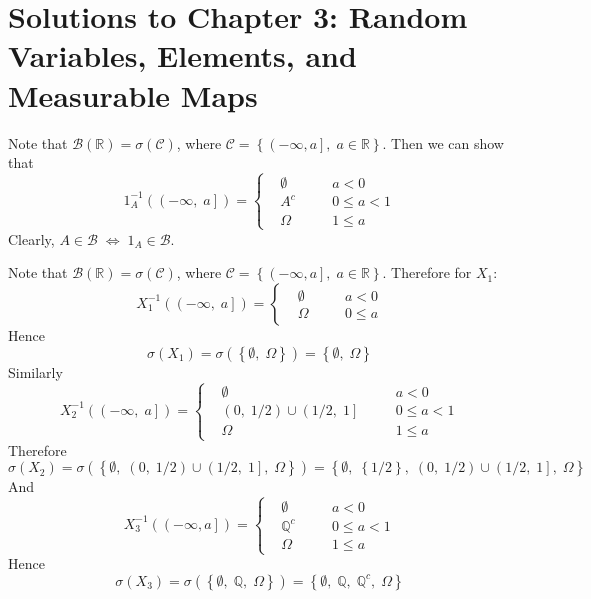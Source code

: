 \section{Solutions to Chapter 3: Random Variables, Elements, and Measurable Maps}
\label{sec:solutions-chapter-3}

\setcounter{Lcount}{0}
\begin{list}{3.4.}{}
\item Note that $\mathcal{B}\left(\mathbb{R}\right) = \sigma\left(\mathcal{C}\right)$, where $\mathcal{C}=\left\{\left(-\infty, a\right],\;a\in\mathbb{R}\right\}$. Then we can show that
  \[
    1_A^{-1}\left(\left(-\infty,\;a\right]\right)
    =
    \left\{
      \begin{aligned}
        & \emptyset &&\quad a < 0    \\
        & A^c &&\quad 0 \leq a < 1    \\
        & \Omega &&\quad 1 \leq a
      \end{aligned}
    \right.
  \]
  Clearly, $A\in\mathcal{B}\;\iff\;1_A\in\mathcal{B}$.
  
\item  Note that $\mathcal{B}\left(\mathbb{R}\right) = \sigma\left(\mathcal{C}\right)$, where $\mathcal{C}=\left\{\left(-\infty, a\right],\;a\in\mathbb{R}\right\}$. Therefore for $X_1$:
  \[
    X_1^{-1}\left(\left(-\infty, \; a\right]\right) =
    \left\{
      \begin{aligned}
        & \emptyset &&\quad a < 0    \\
        & \Omega &&\quad 0 \leq a
      \end{aligned}
    \right.
  \]
  Hence
  \[
    \sigma\left(X_1\right)
    = \sigma\left(\left\{\emptyset,\; \Omega\right\}\right)
    = \left\{\emptyset,\; \Omega\right\}
  \]
  Similarly
  \[
    X_2^{-1}\left(\left(-\infty,\; a\right]\right) =
    \left\{
      \begin{aligned}
        & \emptyset &&\quad a < 0    \\
        & \left(0,\;1/2\right)\cup\left(1/2,\;1\right] &&\quad 0 \leq a < 1    \\
        & \Omega  &&\quad 1 \leq a
      \end{aligned}
    \right.
  \]
  Therefore
  \[
    \sigma\left(X_2\right)
    = \sigma\left(\left\{\emptyset,\; \left(0,\;1/2\right)\cup\left(1/2,\;1\right],\; \Omega\right\}\right)
    = \left\{\emptyset,\; \left\{1/2\right\},\; \left(0,\;1/2\right)\cup\left(1/2,\;1\right],\; \Omega\right\}
  \]
  And
  \[
    X_3^{-1}\left(\left(-\infty, a\right]\right) =
    \left\{
      \begin{aligned}
        & \emptyset &&\quad a < 0    \\
        & \mathbb{Q}^c &&\quad 0 \leq a < 1    \\
        & \Omega &&\quad 1 \leq a
      \end{aligned}
    \right.
  \]
  Hence
  \[
    \sigma\left(X_3\right)
    = \sigma\left(\left\{\emptyset,\; \mathbb{Q},\; \Omega\right\}\right)
    = \left\{\emptyset,\; \mathbb{Q},\; \mathbb{Q}^c,\; \Omega\right\}
  \]
\end{list}

\clearpage{}

